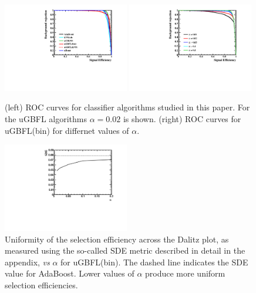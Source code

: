 \begin{figure}[] 
  \centering 
  \includegraphics[width=0.49\textwidth]{ROC_DP.pdf}
  \includegraphics[width=0.49\textwidth]{ROC_DP_Alpha.pdf}\\
  \caption{\label{fig:dalitz_rocs} (left) ROC curves for classifier algorithms studied in this paper.  For the uGBFL algorithms $\alpha=0.02$ is shown.  (right) ROC curves for uGBFL(bin) for differnet values of $\alpha$.}
\end{figure}

\begin{figure}[] 
  \centering 
  \includegraphics[width=0.49\textwidth]{sde_v_alpha.pdf}
  \caption{\label{fig:dalitz_sde_v_alpha} Uniformity of the selection efficiency across the Dalitz plot, as measured using the so-called SDE metric described in detail in the appendix, {\em vs} $\alpha$ for uGBFL(bin).  The dashed line indicates the SDE value for AdaBoost.  Lower values of $\alpha$ produce more uniform selection efficiencies.}
\end{figure}


